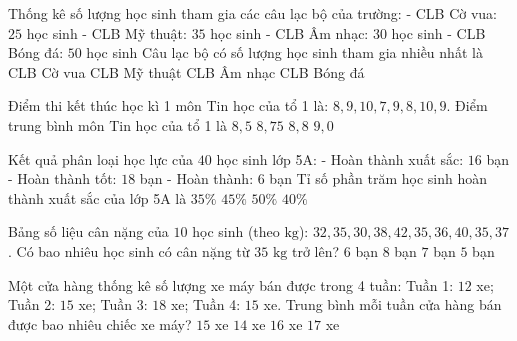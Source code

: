 \begin{ex} %
Thống kê số lượng học sinh tham gia các câu lạc bộ của trường:
- CLB Cờ vua: $25$ học sinh
- CLB Mỹ thuật: $35$ học sinh
- CLB Âm nhạc: $30$ học sinh
- CLB Bóng đá: $50$ học sinh
Câu lạc bộ có số lượng học sinh tham gia nhiều nhất là
\choice
{CLB Cờ vua}
{CLB Mỹ thuật}
{CLB Âm nhạc}
{\True CLB Bóng đá}
\end{ex}

\begin{ex} %
Điểm thi kết thúc học kì 1 môn Tin học của tổ 1 là: $8, 9, 10, 7, 9, 8, 10, 9$. Điểm trung bình môn Tin học của tổ 1 là
\choice
{$8{,}5$}
{\True $8{,}75$}
{$8{,}8$}
{$9{,}0$}
\end{ex}

\begin{ex} %
Kết quả phân loại học lực của $40$ học sinh lớp 5A:
- Hoàn thành xuất sắc: $16$ bạn
- Hoàn thành tốt: $18$ bạn
- Hoàn thành: $6$ bạn
Tỉ số phần trăm học sinh hoàn thành xuất sắc của lớp 5A là
\choice
{$35\%$}
{$45\%$}
{$50\%$}
{\True $40\%$}
\end{ex}

\begin{ex} %
Bảng số liệu cân nặng của $10$ học sinh (theo $\text{kg}$): $32, 35, 30, 38, 42, 35, 36, 40, 35, 37$. Có bao nhiêu học sinh có cân nặng từ $35\text{ kg}$ trở lên?
\choice
{$6$ bạn}
{\True $8$ bạn}
{$7$ bạn}
{$5$ bạn}
\end{ex}

\begin{ex} %
Một cửa hàng thống kê số lượng xe máy bán được trong 4 tuần:
Tuần 1: $12$ xe; Tuần 2: $15$ xe; Tuần 3: $18$ xe; Tuần 4: $15$ xe.
Trung bình mỗi tuần cửa hàng bán được bao nhiêu chiếc xe máy?
\choice
{\True $15$ xe}
{$14$ xe}
{$16$ xe}
{$17$ xe}
\end{ex}

